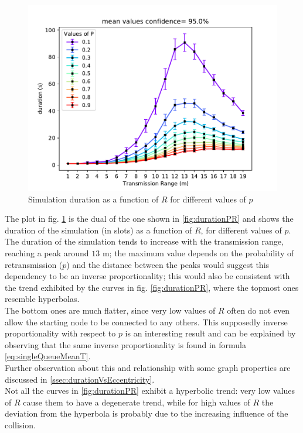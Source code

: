 \begin{figure}[H]
    \begin{center}
        \includegraphics[scale=.7]{img/big_duration (s)_r_mean_95.0.pdf}
    \end{center}
    \vspace*{-0.5cm}
    \caption{Simulation duration as a function of $R$ for different values of $p$}
    \label{fig:durationRP}
\end{figure}
\noindent

The plot in fig. \ref{fig:durationRP} is the dual of the one shown in \ref{fig:durationPR} and shows the duration of the simulation (in slots) as a
function of $R$, for different values of $p$.\\
The duration of the simulation tends to increase with the transmission range,
reaching a peak around $13$ m; the maximum value depends on the probability of
retransmission ($p$) and the distance between the peaks would suggest this dependency to be an inverse proportionality; this would also be consistent with the trend exhibited by the curves in fig. \ref{fig:durationPR}, where the topmost ones resemble hyperbolas.\\
The bottom ones are much flatter, since very low values of $R$ often do not even allow the starting node to be connected to any others.
This supposedly inverse proportionality with respect to $p$ is an interesting result and can be explained by observing that the same inverse proportionality is found in formula \ref{eq:singleQueueMeanT}.\\
Further observation about this and relationship with some graph properties are discussed in \ref{ssec:durationVsEccentricity}.\\
Not all the curves in \ref{fig:durationPR} exhibit a hyperbolic trend: very low values of $R$ cause them to have a degenerate trend, while for high values of $R$ the deviation from the hyperbola is probably due to the increasing influence of the collision.

